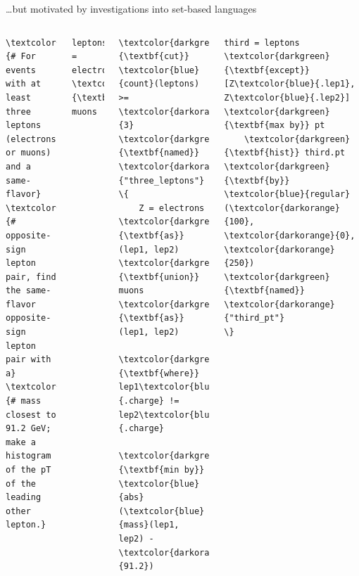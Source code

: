 \documentclass[aspectratio=169]{beamer}
\begin{document}
\begin{frame}[fragile]{\ldots but motivated by investigations into set-based languages}
\vspace{0.1 cm}
\begin{center}
\end{center}

\vspace{-0.25 cm}
\begin{columns}
\scriptsize
\begin{Verbatim}[commandchars=\\\{\}]
\textcolor{gray}{# For events with at least three leptons (electrons or muons) and a same-flavor}
\textcolor{gray}{# opposite-sign lepton pair, find the same-flavor opposite-sign lepton pair with a}
\textcolor{gray}{# mass closest to 91.2 GeV; make a histogram of the pT of the leading other lepton.}
\end{Verbatim}

\small
\vspace{-0.25 cm}
\begin{Verbatim}[commandchars=\\\{\}]
leptons = electrons \textcolor{darkgreen}{\textbf{union}} muons
\end{Verbatim}

\vspace{-0.45 cm}
\begin{Verbatim}[commandchars=\\\{\}]
\textcolor{darkgreen}{\textbf{cut}} \textcolor{blue}{count}(leptons) >= \textcolor{darkorange}{3} \textcolor{darkgreen}{\textbf{named}} \textcolor{darkorange}{"three_leptons"} \{
    Z = electrons \textcolor{darkgreen}{\textbf{as}} (lep1, lep2) \textcolor{darkgreen}{\textbf{union}} muons \textcolor{darkgreen}{\textbf{as}} (lep1, lep2)
            \textcolor{darkgreen}{\textbf{where}} lep1\textcolor{blue}{.charge} != lep2\textcolor{blue}{.charge}
            \textcolor{darkgreen}{\textbf{min by}} \textcolor{blue}{abs}(\textcolor{blue}{mass}(lep1, lep2) - \textcolor{darkorange}{91.2})
\end{Verbatim}

\vspace{-0.45 cm}
\begin{Verbatim}[commandchars=\\\{\}]
    third = leptons \textcolor{darkgreen}{\textbf{except}} [Z\textcolor{blue}{.lep1}, Z\textcolor{blue}{.lep2}] \textcolor{darkgreen}{\textbf{max by}} pt
    \textcolor{darkgreen}{\textbf{hist}} third.pt \textcolor{darkgreen}{\textbf{by}} \textcolor{blue}{regular}(\textcolor{darkorange}{100}, \textcolor{darkorange}{0}, \textcolor{darkorange}{250}) \textcolor{darkgreen}{\textbf{named}} \textcolor{darkorange}{"third_pt"}
\}
\end{Verbatim}


\end{columns}
\end{frame}
\end{document}
